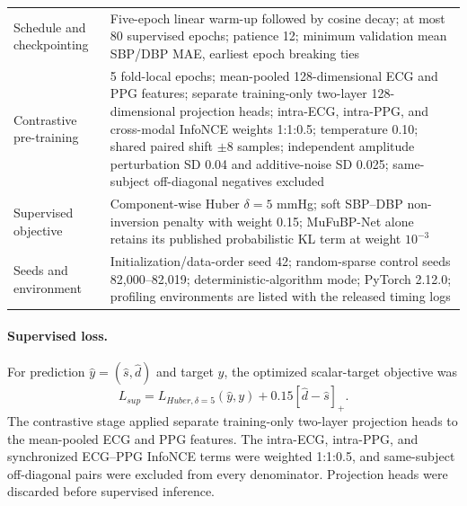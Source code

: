 \documentclass[11pt]{article}
\begin{document}
\begin{table}[H]
{\begin{tabular}{p{4.2cm}p{12.8cm}}
Schedule and checkpointing & Five-epoch linear warm-up followed by cosine decay; at most 80 supervised epochs; patience 12; minimum validation mean SBP/DBP MAE, earliest epoch breaking ties \\
  Contrastive pre-training & 5 fold-local epochs; mean-pooled 128-dimensional ECG and PPG features; separate training-only two-layer 128-dimensional projection heads; intra-ECG, intra-PPG, and cross-modal InfoNCE weights 1:1:0.5; temperature 0.10; shared paired shift $\pm8$ samples; independent amplitude perturbation SD 0.04 and additive-noise SD 0.025; same-subject off-diagonal negatives excluded \\
  Supervised objective & Component-wise Huber $\delta=5$ mmHg; soft SBP--DBP non-inversion penalty with weight 0.15; MuFuBP-Net alone retains its published probabilistic KL term at weight $10^{-3}$ \\
  Seeds and environment & Initialization/data-order seed 42; random-sparse control seeds 82{,}000--82{,}019; deterministic-algorithm mode; PyTorch 2.12.0; profiling environments are listed with the released timing logs \\
\bottomrule
\end{tabular}}
\end{table}

\paragraph{Supervised loss.} For prediction $\hat y=(\hat s,\hat d)$ and target $y$, the optimized scalar-target objective was
\[
L_{sup}=L_{Huber,\delta=5}(\hat y,y)+0.15[\hat d-\hat s]_+.
\]
The contrastive stage applied separate training-only two-layer projection heads to the mean-pooled ECG and PPG features. The intra-ECG, intra-PPG, and synchronized ECG--PPG InfoNCE terms were weighted 1:1:0.5, and same-subject off-diagonal pairs were excluded from every denominator. Projection heads were discarded before supervised inference.
\end{document}
